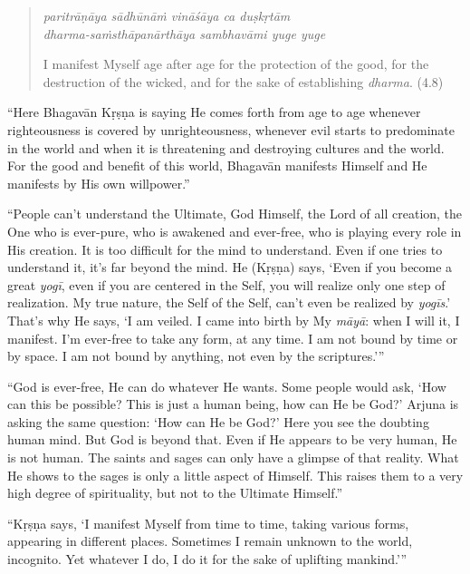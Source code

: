 \documentclass[12pt, twoside, openright]{memoir}
\begin{document}
\par
\begin{verse}
\textit{paritrāṇāya sādhūnāṁ vināśāya ca duṣkṛtām} \\
\textit{dharma-saṁsthāpanārthāya sambhavāmi yuge yuge}

\noindent I manifest Myself age after age for the protection of the good, for the destruction of the wicked, and for the sake of establishing \textit{dharma}. (4.8)
\end{verse}
\par


\enquote{Here Bhagavān Kṛṣṇa is saying He comes forth from age to age whenever righteousness is covered by unrighteousness, whenever evil starts to predominate in the world and when it is threatening and destroying cultures and the world. For the good and benefit of this world, Bhagavān manifests Himself and He manifests by His own willpower.}

\enquote{People can’t understand the Ultimate, God Himself, the Lord of all creation, the One who is ever-pure, who is awakened and ever-free, who is playing every role in His creation. It is too difficult for the mind to understand. Even if one tries to understand it, it’s far beyond the mind. He (Kṛṣṇa) says, \enquote{Even if you become a great \textit{yogī}, even if you are centered in the Self, you will realize only one step of realization. My true nature, the Self of the Self, can’t even be realized by \textit{yogīs}.} That’s why He says, \enquote{I am veiled. I came into birth by My \textit{māyā}: when I will it, I manifest. I’m ever-free to take any form, at any time. I am not bound by time or by space. I am not bound by anything, not even by the scriptures.}}

\enquote{God is ever-free, He can do whatever He wants. Some people would ask, \enquote{How can this be possible? This is just a human being, how can He be God?} Arjuna is asking the same question: \enquote{How can He be God?} Here you see the doubting human mind. But God is beyond that. Even if He appears to be very human, He is not human. The saints and sages can only have a glimpse of that reality. What He shows to the sages is only a little aspect of Himself. This raises them to a very high degree of spirituality, but not to the Ultimate Himself.}

\enquote{Kṛṣṇa says, \enquote{I manifest Myself from time to time, taking various forms, appearing in different places. Sometimes I remain unknown to the world, incognito. Yet whatever I do, I do it for the sake of uplifting mankind.}}
\end{document}

